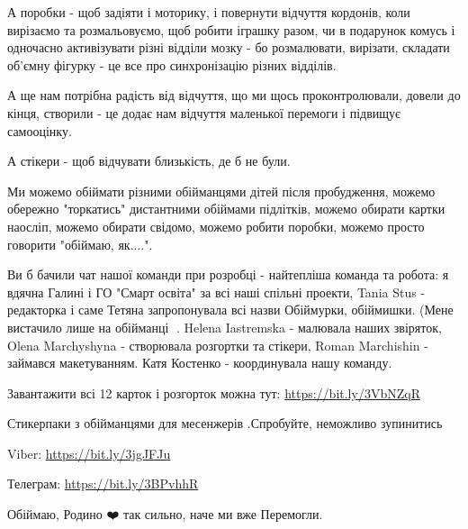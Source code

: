 А поробки - щоб задіяти і моторику, і повернути відчуття кордонів, коли
вирізаємо та розмальовуємо, щоб робити іграшку разом, чи в подарунок комусь і
одночасно активізувати різні відділи мозку  - бо розмалювати, вирізати,
складати об'ємну фігурку - це все про синхронізацію різних відділів.

А ще нам потрібна радість від відчуття, що ми щось проконтролювали, довели до
кінця, створили - це додає нам відчуття маленької перемоги і підвищує
самооцінку.

А стікери - щоб відчувати близькість, де б не були.

Ми можемо обіймати різними обійманцями дітей після пробудження, можемо обережно
"торкатись" дистантними обіймами підлітків, можемо обирати картки наосліп,
можемо обирати свідомо, можемо робити поробки, можемо просто говорити "обіймаю,
як....".

Ви б бачили чат нашої команди при розробці - найтепліша команда та робота: я
вдячна Галині  і ГО "Смарт освіта"  за всі наші спільні проекти, Tania Stus  -
редакторка і саме Тетяна запропонувала всі назви Обіймурки, обіймишки. (Мене
вистачило лише на обійманці 🙂. Helena Iastremska  - малювала наших звіряток,
Olena Marchyshyna  - створювала розгортки та стікери, Roman Marchishin  -
займався макетуванням. Катя Костенко  - координувала нашу команду.

Завантажити всі 12 карток і розгорток можна тут: \url{https://bit.ly/3VbNZqR}

Стикерпаки з обійманцями для месенжерів .Спробуйте, неможливо зупинитись

Viber: \url{https://bit.ly/3jgJFJu}

Телеграм: \url{https://bit.ly/3BPvhhR}

Обіймаю, Родино ❤️ так сильно, наче ми вже Перемогли.

